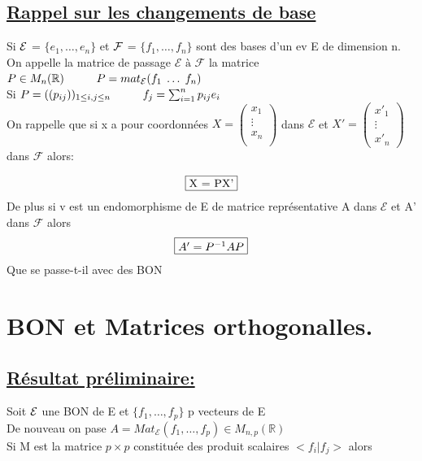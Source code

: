 \documentclass{article}
\newcommand\tab[1][1cm]{\hspace*{#1}}
\begin{document}
\subsection{\underline{Rappel sur les changements de base}}
Si $\cal{E}$ = $\{e_1, \dots, e_n\}$ et $\cal{F}$ = $\{f_1, \dots, f_n\}$ sont des bases d'un ev E de dimension n.\\
On appelle la matrice de passage $\mathcal E \mbox{ à } \mathcal{F}$ la matrice $P \in M_n(\mathbb{R}) \tab P = mat_{\mathcal{E}}(f_1 \; \dots \; f_n)$\\
Si $P = ((p_{ij}))_{1 \leq i,j \leq n} \tab f_j = \sum_{i = 1}^n p_{ij} e_i$\\
On rappelle que si x a pour coordonnées $X = \begin{pmatrix}
    x_1\\
    \vdots\\
    x_n\\
\end{pmatrix}$ dans $\mathcal{E}$ et $X' = \begin{pmatrix}
    x'_1\\
    \vdots\\
    x'_n
\end{pmatrix}$ dans $\mathcal{F}$ alors:

\begin{align*}
    \fbox{X = PX'}
\end{align*}
De plus si v est un endomorphisme de E de matrice représentative A dans $\mathcal{E}$ et A' dans $\mathcal{F}$ alors
\begin{align*}
    \fbox{$A' = P^{-1} A P$}
\end{align*}
Que se passe-t-il avec des BON

\section{BON et Matrices orthogonalles.}

\subsection{\underline{Résultat préliminaire:}}
Soit $\cal E$ une BON de E et $\{f_1, \dots, f_p\}$ p vecteurs de E\\
De nouveau on pase $A = Mat_{\mathcal{E}}(f_1, \dots, f_p) \in M_{n, p}(\mathbb{R})$\\
Si M est la matrice $p \times p$ constituée des produit scalaires $<f_i | f_j>$ alors\\
\end{document}
